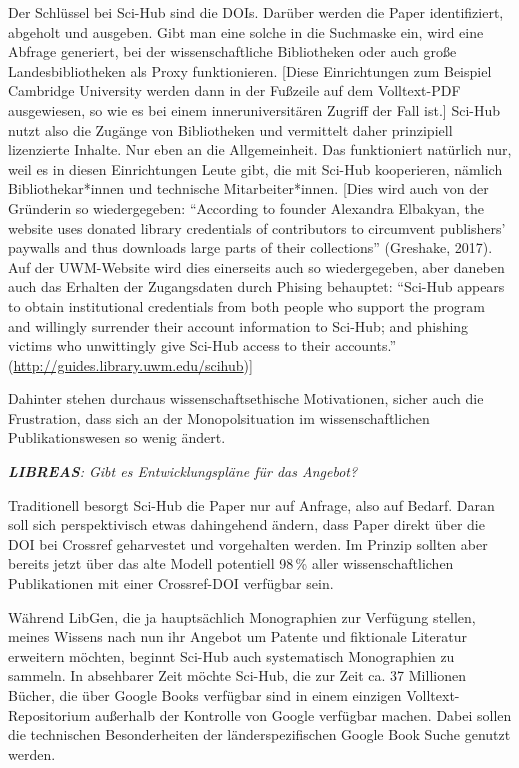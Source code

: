 \documentclass[a4paper,
fontsize=11pt,
oneside,
numbers=noperiodatend,
parskip=half-,
bibliography=totoc,
final
]{scrartcl}
\begin{document}
Der Schlüssel bei Sci-Hub sind die DOIs. Darüber werden die Paper
identifiziert, abgeholt und ausgeben. Gibt man eine solche in die
Suchmaske ein, wird eine Abfrage generiert, bei der wissenschaftliche
Bibliotheken oder auch große Landesbibliotheken als Proxy funktionieren.
{[}Diese Einrichtungen zum Beispiel Cambridge University werden dann in
der Fußzeile auf dem Volltext-PDF ausgewiesen, so wie es bei einem
inneruniversitären Zugriff der Fall ist.{]} Sci-Hub nutzt also die
Zugänge von Bibliotheken und vermittelt daher prinzipiell lizenzierte
Inhalte. Nur eben an die Allgemeinheit. Das funktioniert natürlich nur,
weil es in diesen Einrichtungen Leute gibt, die mit Sci-Hub kooperieren,
nämlich Bibliothekar*innen und technische Mitarbeiter*innen. {[}Dies
wird auch von der Gründerin so wiedergegeben: \enquote{According to
founder Alexandra Elbakyan, the website uses donated library credentials
of contributors to circumvent publishers' paywalls and thus downloads
large parts of their collections} (Greshake, 2017). Auf der UWM-Website
wird dies einerseits auch so wiedergegeben, aber daneben auch das
Erhalten der Zugangsdaten durch Phising behauptet: \enquote{Sci-Hub
appears to obtain institutional credentials from both people who support
the program and willingly surrender their account information to
Sci-Hub; and phishing victims who unwittingly give Sci-Hub access to
their accounts.} (\url{http://guides.library.uwm.edu/scihub}){]}

Dahinter stehen durchaus wissenschaftsethische Motivationen, sicher auch
die Frustration, dass sich an der Monopolsituation im wissenschaftlichen
Publikationswesen so wenig ändert.

\emph{\textbf{LIBREAS}: Gibt es Entwicklungspläne für das Angebot?}

Traditionell besorgt Sci-Hub die Paper nur auf Anfrage, also auf Bedarf.
Daran soll sich perspektivisch etwas dahingehend ändern, dass Paper
direkt über die DOI bei Crossref geharvestet und vorgehalten werden. Im
Prinzip sollten aber bereits jetzt über das alte Modell potentiell
98\,\% aller wissenschaftlichen Publikationen mit einer Crossref-DOI
verfügbar sein.

Während LibGen, die ja hauptsächlich Monographien zur Verfügung stellen,
meines Wissens nach nun ihr Angebot um Patente und fiktionale Literatur
erweitern möchten, beginnt Sci-Hub auch systematisch Monographien zu
sammeln. In absehbarer Zeit möchte Sci-Hub, die zur Zeit ca. 37
Millionen Bücher, die über Google Books verfügbar sind in einem einzigen
Volltext-Repositorium außerhalb der Kontrolle von Google verfügbar
machen. Dabei sollen die technischen Besonderheiten der
länderspezifischen Google Book Suche genutzt werden.
\end{document}
